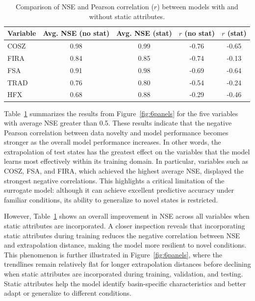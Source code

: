\documentclass{article}
\begin{document}
\begin{table}[h!]
    \centering
    \small
    \begin{tabular}{lcccc}
        \toprule
        \textbf{Variable} & \textbf{Avg. NSE (no stat)} & \textbf{Avg. NSE (stat)} & \textbf{$r$ (no stat)} & \textbf{$r$ (stat)} \\
        \midrule
        COSZ & 0.98 & 0.99 & -0.76 & -0.65 \\
        FIRA & 0.84 & 0.85 & -0.74 & -0.13 \\
        FSA  & 0.91 & 0.98 & -0.69 & -0.64 \\
        TRAD & 0.76 & 0.80 & -0.54 & -0.24 \\
        HFX  & 0.68 & 0.88 & -0.29 & -0.46 \\
        \bottomrule
    \end{tabular}
    \caption{Comparison of NSE and Pearson correlation ($r$) between models with and without static attributes.}
    \label{tab:performance_correlation}
\end{table}

Table~\ref{tab:performance_correlation} summarizes the results from Figure~\ref{fig:6panels} for the five variables with average NSE greater than 0.5. These results indicate that the negative Pearson correlation between data novelty and model performance becomes stronger as the overall model performance increases. In other words, the extrapolation of test states has the greatest effect on the variables that the model learns most effectively within its training domain. In particular, variables such as COSZ, FSA, and FIRA, which achieved the highest average NSE, displayed the strongest negative correlations. This highlights a critical limitation of the surrogate model: although it can achieve excellent predictive accuracy under familiar conditions, its ability to generalize to novel states is restricted.

However, Table~\ref{tab:performance_correlation} shows an overall improvement in NSE across all variables when static attributes are incorporated. A closer inspection reveals that incorporating static attributes during training reduces the negative correlation between NSE and extrapolation distance, making the model more resilient to novel conditions. This phenomenon is further illustrated in Figure~\ref{fig:6panels}, where the trendlines remain relatively flat for longer extrapolation distances before declining when static attributes are incorporated during training, validation, and testing. Static attributes help the model identify basin-specific characteristics and better adapt or generalize to different conditions.
\end{document}
